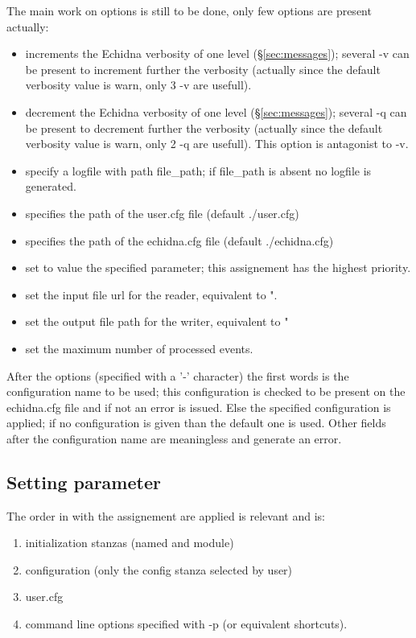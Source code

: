 The main work on options is still to be done, only few options are present actually:
\begin{itemize}
\item {} increments the Echidna verbosity of one level (\S\ref{sec:messages}); several -v can be
present to increment further the verbosity (actually since the default verbosity value is warn, only
3 -v are usefull).
\item {} decrement the Echidna verbosity of one level (\S\ref{sec:messages}); several -q can be
present to decrement further the verbosity (actually since the default verbosity value is warn, only
2 -q are usefull). This option is antagonist to -v.
\item {} specify a logfile with path {\code file\_path}; if file\_path is absent no
logfile is generated.
\item {} specifies the path of the user.cfg file (default ./user.cfg)
\item {} specifies the path of the echidna.cfg file (default ./echidna.cfg)
\item {} set to value the specified parameter; this assignement has the highest
priority.
\item {} set the input file url for the reader, equivalent to ".
\item {} set the output file path for the writer, equivalent to "
\item {} set the maximum number of processed events.
\end{itemize}

After the options (specified with a '-' character) the first words is the configuration name to be used; this configuration
is checked to be present on the echidna.cfg file and if not an error is issued. Else the specified configuration is
applied; if no configuration is given than the default one is used.
Other fields after the configuration name are meaningless and generate an error.

\subsection{Setting parameter}
\label{sec:conf_param}
The order in with the assignement are applied is relevant and is:
\begin{enumerate}
\item initialization stanzas (named and module)
\item configuration (only the config stanza selected by user)
\item user.cfg
\item command line options specified with -p (or equivalent shortcuts).
\end{enumerate}

